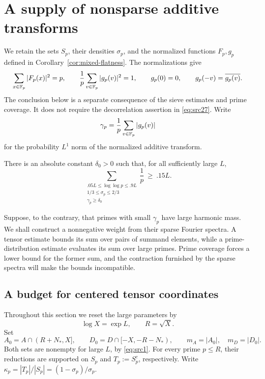 \section{A supply of nonsparse additive transforms}\label{sec:supply}

We retain the sets \(S_p\), their densities \(\sigma_p\), and the normalized
functions \(F_p,g_p\) defined in Corollary~\ref{cor:mixed-flatness}.
The normalizations give
\[
 \sum_{x\in\mathbb F_p}|F_p(x)|^2=p,\qquad
 \frac1p\sum_{v\in\mathbb F_p}|g_p(v)|^2=1,\qquad
 g_p(0)=0,\qquad g_p(-v)=\overline{g_p(v)}.
\]
The conclusion below is a separate consequence of the sieve estimates and
prime coverage. It does not require the decorrelation assertion in
\eqref{eq:src27}.
Write
\[
 \gamma_p=\frac1p\sum_{v\in\mathbb F_p}|g_p(v)|
\]
for the probability $L^1$ norm of the normalized additive transform.

\begin{proposition}\label{prop:supply}
There is an absolute constant \(\delta_0>0\) such that, for all sufficiently
large \(L\),
\begin{equation}\label{eq:src28}
 \sum_{\substack{.05L\le \log\log p\le .9L\\
                  1/3\le \sigma_p\le2/3\\
                  \gamma_p\ge\delta_0}}
        \frac1p \ \ge\ .15L .
\end{equation}
\end{proposition}

Suppose, to the contrary, that primes with small $\gamma_p$ have large
harmonic mass. We shall construct a nonnegative weight from their sparse
Fourier spectra. A tensor estimate bounds its sum over pairs of summand
elements, while a prime-distribution estimate evaluates its sum over
large primes. Prime coverage forces a lower bound for the former sum,
and the contraction furnished by the sparse spectra will make the bounds
incompatible.

\subsection{A budget for centered tensor coordinates}

Throughout this section we reset the large parameters by
\[
 \log X=\exp L,\qquad R=\sqrt X.
\]
Set
\[
 A_0=A\cap(R+N_*,X],\qquad
 D_0=D\cap[-X,-R-N_*),\qquad m_A=|A_0|,\quad m_D=|D_0|.
\]
Both sets are nonempty for large \(L\), by \eqref{eq:src1}. For every prime
\(p\le R\), their reductions are supported on \(S_p\) and
\(T_p:=S_p^c\), respectively. Write
\(\kappa_p=|T_p|/|S_p|=(1-\sigma_p)/\sigma_p\).


